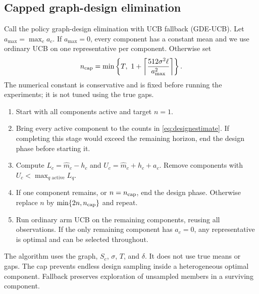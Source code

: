 \subsection{Capped graph-design elimination}
Call the policy graph-design elimination with UCB fallback (GDE-UCB). Let $a_{\max}=\max_ca_c$. If $a_{\max}=0$, every component has a constant mean and we use ordinary UCB on one representative per component. Otherwise set
\begin{equation}
 n_{\rm cap}=\min\left\{T,\ 1+
          \left\lceil\frac{512\sigma^2\ell}{a_{\max}^2}\right\rceil\right\}.
 \label{eq:designcap}
\end{equation}
The numerical constant is conservative and is fixed before running the experiments; it is not tuned using the true gaps.
\begin{enumerate}
 \item Start with all components active and target $n=1$.
 \item Bring every active component to the counts in \eqref{eq:designestimate}. If completing this stage would exceed the remaining horizon, end the design phase before starting it.
 \item Compute $L_c=\widehat m_c-h_c$ and $U_c=\widehat m_c+h_c+a_c$. Remove components with $U_c<\max_{q\text{ active}}L_q$.
 \item If one component remains, or $n=n_{\rm cap}$, end the design phase. Otherwise replace $n$ by $\min\{2n,n_{\rm cap}\}$ and repeat.
 \item Run ordinary arm UCB on the remaining components, reusing all observations. If the only remaining component has $a_c=0$, any representative is optimal and can be selected throughout.
\end{enumerate}
The algorithm uses the graph, $S_c$, $\sigma$, $T$, and $\delta$. It does not use true means or gaps. The cap prevents endless design sampling inside a heterogeneous optimal component. Fallback preserves exploration of unsampled members in a surviving component.

